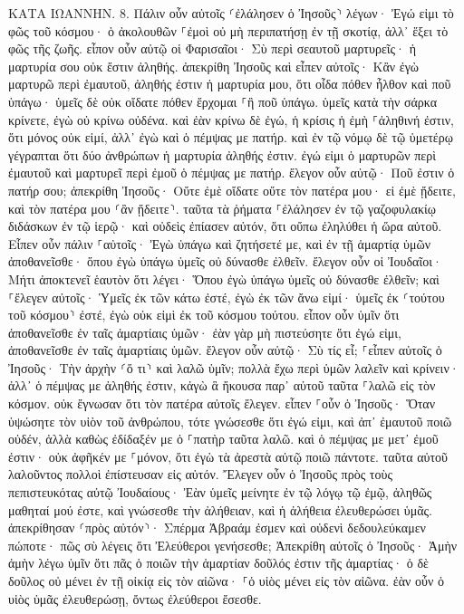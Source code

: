 \documentclass[twoside, 9pt]{extreport}
\begin{document}
ΚΑΤΑ ΙΩΑΝΝΗΝ.
8.
Πάλιν οὖν αὐτοῖς ⸂ἐλάλησεν ὁ Ἰησοῦς⸃ λέγων· Ἐγώ εἰμι τὸ φῶς τοῦ κόσμου· ὁ ἀκολουθῶν ⸀ἐμοὶ οὐ μὴ περιπατήσῃ ἐν τῇ σκοτίᾳ, ἀλλ᾽ ἕξει τὸ φῶς τῆς ζωῆς. 
εἶπον οὖν αὐτῷ οἱ Φαρισαῖοι· Σὺ περὶ σεαυτοῦ μαρτυρεῖς· ἡ μαρτυρία σου οὐκ ἔστιν ἀληθής. 
ἀπεκρίθη Ἰησοῦς καὶ εἶπεν αὐτοῖς· Κἂν ἐγὼ μαρτυρῶ περὶ ἐμαυτοῦ, ἀληθής ἐστιν ἡ μαρτυρία μου, ὅτι οἶδα πόθεν ἦλθον καὶ ποῦ ὑπάγω· ὑμεῖς δὲ οὐκ οἴδατε πόθεν ἔρχομαι ⸀ἢ ποῦ ὑπάγω. 
ὑμεῖς κατὰ τὴν σάρκα κρίνετε, ἐγὼ οὐ κρίνω οὐδένα. 
καὶ ἐὰν κρίνω δὲ ἐγώ, ἡ κρίσις ἡ ἐμὴ ⸀ἀληθινή ἐστιν, ὅτι μόνος οὐκ εἰμί, ἀλλ᾽ ἐγὼ καὶ ὁ πέμψας με πατήρ. 
καὶ ἐν τῷ νόμῳ δὲ τῷ ὑμετέρῳ γέγραπται ὅτι δύο ἀνθρώπων ἡ μαρτυρία ἀληθής ἐστιν. 
ἐγώ εἰμι ὁ μαρτυρῶν περὶ ἐμαυτοῦ καὶ μαρτυρεῖ περὶ ἐμοῦ ὁ πέμψας με πατήρ. 
ἔλεγον οὖν αὐτῷ· Ποῦ ἐστιν ὁ πατήρ σου; ἀπεκρίθη Ἰησοῦς· Οὔτε ἐμὲ οἴδατε οὔτε τὸν πατέρα μου· εἰ ἐμὲ ᾔδειτε, καὶ τὸν πατέρα μου ⸂ἂν ᾔδειτε⸃. 
ταῦτα τὰ ῥήματα ⸀ἐλάλησεν ἐν τῷ γαζοφυλακίῳ διδάσκων ἐν τῷ ἱερῷ· καὶ οὐδεὶς ἐπίασεν αὐτόν, ὅτι οὔπω ἐληλύθει ἡ ὥρα αὐτοῦ. 
Εἶπεν οὖν πάλιν ⸀αὐτοῖς· Ἐγὼ ὑπάγω καὶ ζητήσετέ με, καὶ ἐν τῇ ἁμαρτίᾳ ὑμῶν ἀποθανεῖσθε· ὅπου ἐγὼ ὑπάγω ὑμεῖς οὐ δύνασθε ἐλθεῖν. 
ἔλεγον οὖν οἱ Ἰουδαῖοι· Μήτι ἀποκτενεῖ ἑαυτὸν ὅτι λέγει· Ὅπου ἐγὼ ὑπάγω ὑμεῖς οὐ δύνασθε ἐλθεῖν; 
καὶ ⸀ἔλεγεν αὐτοῖς· Ὑμεῖς ἐκ τῶν κάτω ἐστέ, ἐγὼ ἐκ τῶν ἄνω εἰμί· ὑμεῖς ἐκ ⸂τούτου τοῦ κόσμου⸃ ἐστέ, ἐγὼ οὐκ εἰμὶ ἐκ τοῦ κόσμου τούτου. 
εἶπον οὖν ὑμῖν ὅτι ἀποθανεῖσθε ἐν ταῖς ἁμαρτίαις ὑμῶν· ἐὰν γὰρ μὴ πιστεύσητε ὅτι ἐγώ εἰμι, ἀποθανεῖσθε ἐν ταῖς ἁμαρτίαις ὑμῶν. 
ἔλεγον οὖν αὐτῷ· Σὺ τίς εἶ; ⸀εἶπεν αὐτοῖς ὁ Ἰησοῦς· Τὴν ἀρχὴν ⸂ὅ τι⸃ καὶ λαλῶ ὑμῖν; 
πολλὰ ἔχω περὶ ὑμῶν λαλεῖν καὶ κρίνειν· ἀλλ᾽ ὁ πέμψας με ἀληθής ἐστιν, κἀγὼ ἃ ἤκουσα παρ᾽ αὐτοῦ ταῦτα ⸀λαλῶ εἰς τὸν κόσμον. 
οὐκ ἔγνωσαν ὅτι τὸν πατέρα αὐτοῖς ἔλεγεν. 
εἶπεν ⸀οὖν ὁ Ἰησοῦς· Ὅταν ὑψώσητε τὸν υἱὸν τοῦ ἀνθρώπου, τότε γνώσεσθε ὅτι ἐγώ εἰμι, καὶ ἀπ᾽ ἐμαυτοῦ ποιῶ οὐδέν, ἀλλὰ καθὼς ἐδίδαξέν με ὁ ⸀πατὴρ ταῦτα λαλῶ. 
καὶ ὁ πέμψας με μετ᾽ ἐμοῦ ἐστιν· οὐκ ἀφῆκέν με ⸀μόνον, ὅτι ἐγὼ τὰ ἀρεστὰ αὐτῷ ποιῶ πάντοτε. 
ταῦτα αὐτοῦ λαλοῦντος πολλοὶ ἐπίστευσαν εἰς αὐτόν. 
Ἔλεγεν οὖν ὁ Ἰησοῦς πρὸς τοὺς πεπιστευκότας αὐτῷ Ἰουδαίους· Ἐὰν ὑμεῖς μείνητε ἐν τῷ λόγῳ τῷ ἐμῷ, ἀληθῶς μαθηταί μού ἐστε, 
καὶ γνώσεσθε τὴν ἀλήθειαν, καὶ ἡ ἀλήθεια ἐλευθερώσει ὑμᾶς. 
ἀπεκρίθησαν ⸂πρὸς αὐτόν⸃· Σπέρμα Ἀβραάμ ἐσμεν καὶ οὐδενὶ δεδουλεύκαμεν πώποτε· πῶς σὺ λέγεις ὅτι Ἐλεύθεροι γενήσεσθε; 
Ἀπεκρίθη αὐτοῖς ὁ Ἰησοῦς· Ἀμὴν ἀμὴν λέγω ὑμῖν ὅτι πᾶς ὁ ποιῶν τὴν ἁμαρτίαν δοῦλός ἐστιν τῆς ἁμαρτίας· 
ὁ δὲ δοῦλος οὐ μένει ἐν τῇ οἰκίᾳ εἰς τὸν αἰῶνα· ⸀ὁ υἱὸς μένει εἰς τὸν αἰῶνα. 
ἐὰν οὖν ὁ υἱὸς ὑμᾶς ἐλευθερώσῃ, ὄντως ἐλεύθεροι ἔσεσθε. 
\end{document}
